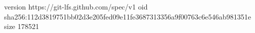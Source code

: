 version https://git-lfs.github.com/spec/v1
oid sha256:112d3819751bb02d3e205fed09e11fe3687313356a9f00763c6e546ab981351e
size 178521
